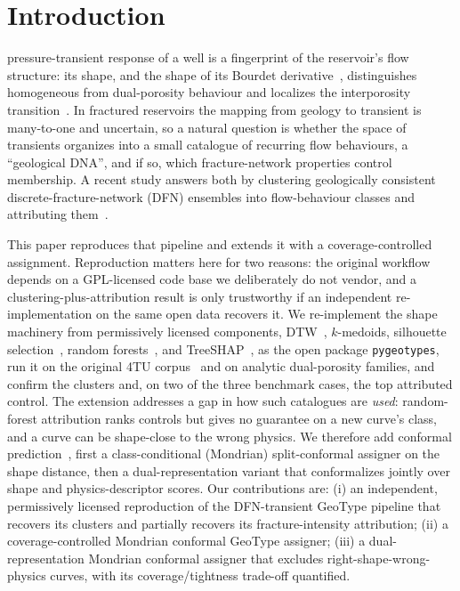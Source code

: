 \documentclass[journal]{IEEEtran}
\begin{document}
\maketitle
\IEEEdisplaynotcompsoctitleabstractindextext
\IEEEpeerreviewmaketitle

\section{Introduction}

 pressure-transient response of a well is a fingerprint of the reservoir's
flow structure: its shape, and the shape of its Bourdet derivative~\cite{bourdet1989},
distinguishes homogeneous from dual-porosity behaviour and localizes the interporosity
transition~\cite{warren1963}. In fractured reservoirs the mapping from geology to transient is
many-to-one and uncertain, so a natural question is whether the space of transients organizes into
a small catalogue of recurring flow behaviours, a ``geological DNA'', and if so, which
fracture-network properties control membership. A recent study answers both by clustering
geologically consistent discrete-fracture-network (DFN) ensembles into flow-behaviour classes and
attributing them~\cite{kameltarghi2026}.

This paper reproduces that pipeline and extends it with a coverage-controlled assignment.
Reproduction matters here for two reasons: the original workflow depends on a GPL-licensed code
base we deliberately do not vendor, and a clustering-plus-attribution result is only trustworthy
if an independent re-implementation on the same open data recovers it. We re-implement the shape
machinery from permissively licensed components, DTW~\cite{sakoe1978}, $k$-medoids, silhouette
selection~\cite{rousseeuw1987}, random forests~\cite{breiman2001}, and TreeSHAP~\cite{lundberg2020},
as the open package \texttt{pygeotypes}, run it on the original 4TU corpus~\cite{data4tu} and on
analytic dual-porosity families, and confirm the clusters and, on two of the three benchmark cases,
the top attributed control. The
extension addresses a gap in how such catalogues are \emph{used}: random-forest attribution ranks
controls but gives no guarantee on a new curve's class, and a curve can be shape-close to the wrong
physics. We therefore add conformal prediction~\cite{vovk2005,angelopoulos2023}, first a
class-conditional (Mondrian) split-conformal assigner on the shape distance, then a
dual-representation variant that conformalizes jointly over shape and physics-descriptor scores.
Our contributions are: (i) an independent, permissively licensed reproduction of the DFN-transient
GeoType pipeline that recovers its clusters and partially recovers its fracture-intensity
attribution; (ii) a
coverage-controlled Mondrian conformal GeoType assigner; (iii) a dual-representation Mondrian
conformal assigner that excludes right-shape-wrong-physics curves, with its coverage/tightness
trade-off quantified.
\end{document}
